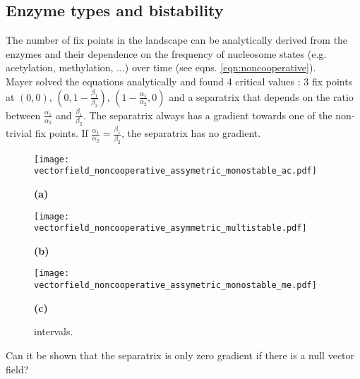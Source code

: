         \subsection{Enzyme types and bistability}
            The number of fix points in the landscape can be analytically derived from the enzymes and their dependence on the frequency of nucleosome states (e.g. acetylation, methylation, ...) over time (see eqns. \ref{eqn:noncooperative}).\\
            Mayer solved the equations analytically and found 4 critical values \cite{mayer2020langevin}: 3 fix points at $(0,0)$, $(0,1-\frac{\beta_1}{\beta_2})$, $(1-\frac{\alpha_1}{\alpha_2},0)$ and a separatrix that depends on the ratio between $\frac{\alpha_1}{\alpha_2}$ and $\frac{\beta_1}{\beta_2}$. The separatrix always has a gradient towards one of the non-trivial fix points. If $\frac{\alpha_1}{\alpha_2} = \frac{\beta_1}{\beta_2}$, the separatrix has no gradient.\\
            \begin{figure}[ht!] %
                \centering
                \begin{minipage}{0.3\textwidth}
                    \texttt{[image: vectorfield\_noncooperative\_assymetric\_monostable\_ac.pdf]}
                    \caption*{\small \textbf{(a)}}
                    \label{}
                \end{minipage}
                \begin{minipage}{0.3\textwidth}
                    \texttt{[image: vectorfield\_noncooperative\_asymmetric\_multistable.pdf]}
                    \caption*{\small \textbf{(b)}}
                    \label{}
                \end{minipage}
                \begin{minipage}{0.3\textwidth}
                    \texttt{[image: vectorfield\_noncooperative\_assymetric\_monostable\_me.pdf]}
                    \caption*{\small \textbf{(c)}}
                    \label{}
                \end{minipage}
               \caption{\small  intervals.}
            \end{figure}
            \begin{itemize}
                {
                    \color{red}
                    \item Can it be shown that the separatrix is only zero gradient if there is a null vector field?
                }
            \end{itemize} %

